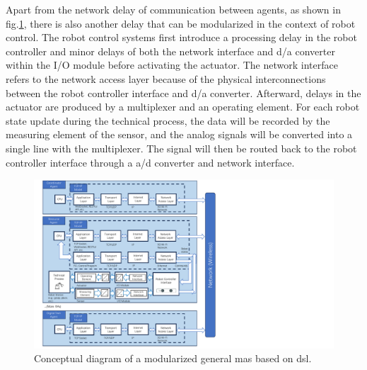 Apart from the network delay of communication between 
agents, as shown in fig.\ref{fig: DSLConceptual}, there is also another 
delay that can be modularized in 
the context of robot control. The robot control systems first introduce a processing 
delay in the robot controller and minor delays of both the network interface and 
\gls{d/a} converter within the I/O module before activating 
the actuator. The network interface refers to the network access layer because of 
the physical interconnections between the robot controller interface and \gls{d/a} converter. 
Afterward, delays in the actuator are produced by a multiplexer and an operating element. 
For each robot state update during the technical process, the data will be recorded 
by the measuring element of the sensor, and the analog signals will be 
converted into a single line with the multiplexer. The signal will then be routed 
back to the robot controller interface through a \gls{a/d} converter and network interface. 








\begin{figure}[htb]
    \includegraphics[width=\textwidth]{figures/DSLConceptual.pdf}
    
    \centering
    \caption{Conceptual diagram of a modularized general \gls{mas} based on \gls{dsl}. \label{fig: DSLConceptual}}
\end{figure}
        